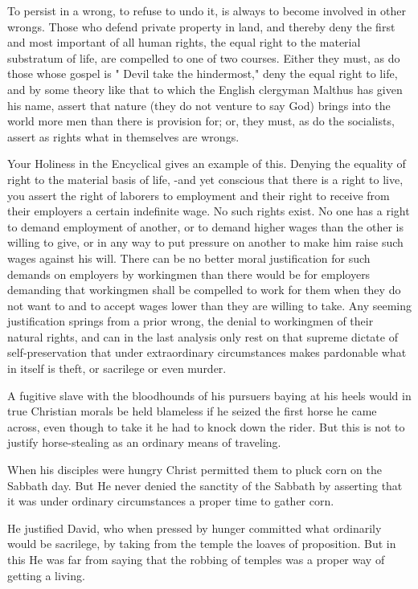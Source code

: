 \documentclass{book}
\begin{document}
To persist in a wrong, to refuse to undo it, is always to become involved in other wrongs. Those who defend private property in land, and thereby deny the first and most important of all human rights, the equal right to the material substratum of life, are compelled to one of two courses. Either they must, as do those whose gospel is " Devil take the hindermost," deny the equal right to life, and by some theory like that to which the English clergyman Malthus has given his name, assert that nature (they do not venture to say God) brings into the world more men than there is provision for; or, they must, as do the socialists, assert as rights what in themselves are wrongs.

Your Holiness in the Encyclical gives an example of this. Denying the equality of right to the material basis of life, -and yet conscious that there is a right to live, you assert the right of laborers to employment and their right to receive from their employers a certain indefinite wage. No such rights exist. No one has a right to demand employment of another, or to demand higher wages than the other is willing to give, or in any way to put pressure on another to make him raise such wages against his will. There can be no better moral justification for such demands on employers by workingmen than there would be for employers demanding that workingmen shall be compelled to work for them when they do not want to and to accept wages lower than they are willing to take. Any seeming justification springs from a prior wrong, the denial to workingmen of their natural rights, and can in the last analysis only rest on that supreme dictate of self-preservation that under extraordinary circumstances makes pardonable what in itself is theft, or sacrilege or even murder.

A fugitive slave with the bloodhounds of his pursuers baying at his heels would in true Christian morals be held blameless if he seized the first horse he came across, even though to take it he had to knock down the rider. But this is not to justify horse-stealing as an ordinary means of traveling.

When his disciples were hungry Christ permitted them to pluck corn on the Sabbath day. But He never denied the sanctity of the Sabbath by asserting that it was under ordinary circumstances a proper time to gather corn.

He justified David, who when pressed by hunger committed what ordinarily would be sacrilege, by taking from the temple the loaves of proposition. But in this He was far from saying that the robbing of temples was a proper way of getting a living.
\end{document}
